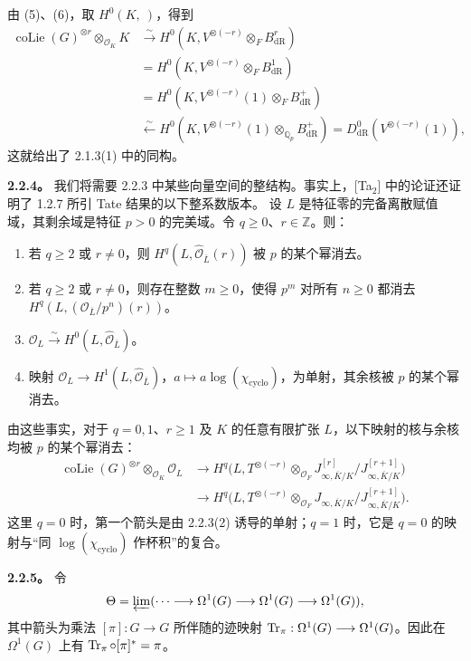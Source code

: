 由 (5)、(6)，取 $H^0(K,\ )$，得到
\begin{align*}
 \operatorname{coLie}(G)^{\otimes r}\otimes_{\mathcal O_K}K
 &\xrightarrow{\sim}H^0(K,V^{\otimes(-r)}\otimes_F B^r_{\mathrm{dR}})\\
 &=H^0(K,V^{\otimes(-r)}\otimes_F B^1_{\mathrm{dR}})\\
 &=H^0(K,V^{\otimes(-r)}(1)\otimes_F B^+_{\mathrm{dR}})\\
 &\xleftarrow{\sim}H^0(K,V^{\otimes(-r)}(1)\otimes_{\mathbb Q_p}B^+_{\mathrm{dR}})
 =D^0_{\mathrm{dR}}(V^{\otimes(-r)}(1)),
\end{align*}
这就给出了 2.1.3(1) 中的同构。

\textbf{2.2.4。} 我们将需要 2.2.3 中某些向量空间的整结构。事实上，[Ta$_2$] 中的论证还证明了 1.2.7 所引 Tate 结果的以下整系数版本。
设 $L$ 是特征零的完备离散赋值域，其剩余域是特征 $p>0$ 的完美域。令 $q\ge0$、$r\in\mathbb Z$。则：
\begin{enumerate}[label=(\arabic*)]
\item 若 $q\ge2$ 或 $r\ne0$，则 $H^q(L,\widehat{\mathcal O}_{\overline L}(r))$ 被 $p$ 的某个幂消去。
\item 若 $q\ge2$ 或 $r\ne0$，则存在整数 $m\ge0$，使得 $p^m$ 对所有 $n\ge0$ 都消去 $H^q(L,(\mathcal O_{\overline L}/p^n)(r))$。
\item $\mathcal O_L\xrightarrow{\sim}H^0(L,\widehat{\mathcal O}_{\overline L})$。
\item 映射 $\mathcal O_L\longrightarrow H^1(L,\widehat{\mathcal O}_{\overline L})$，$a\mapsto a\log(\chi_{\mathrm{cyclo}})$，为单射，其余核被 $p$ 的某个幂消去。
\end{enumerate}
由这些事实，对于 $q=0,1$、$r\ge1$ 及 $K$ 的任意有限扩张 $L$，以下映射的核与余核均被 $p$ 的某个幂消去：
\begin{align*}
 \operatorname{coLie}(G)^{\otimes r}\otimes_{\mathcal O_K}\mathcal O_L
 &\longrightarrow H^q\bigl(L,T^{\otimes(-r)}\otimes_{\mathcal O_F}
 J^{[r]}_{\infty,\overline K/K}/J^{[r+1]}_{\infty,\overline K/K}\bigr)\\
 &\longrightarrow H^q\bigl(L,T^{\otimes(-r)}\otimes_{\mathcal O_F}
 J_{\infty,\overline K/K}/J^{[r+1]}_{\infty,\overline K/K}\bigr).
\end{align*}
这里 $q=0$ 时，第一个箭头是由 2.2.3(2) 诱导的单射；$q=1$ 时，它是 $q=0$ 的映射与“同 $\log(\chi_{\mathrm{cyclo}})$ 作杯积”的复合。

\textbf{2.2.5。} 令
\[
 \Theta=\varprojlim(\cdots\longrightarrow\Omega^1(G)\longrightarrow\Omega^1(G)\longrightarrow\Omega^1(G)),
\]
其中箭头为乘法 $[\pi]:G\longrightarrow G$ 所伴随的迹映射 $\operatorname{Tr}_\pi:\Omega^1(G)\longrightarrow\Omega^1(G)$。因此在 $\Omega^1(G)$ 上有 $\operatorname{Tr}_\pi\circ[\pi]^*=\pi$。

